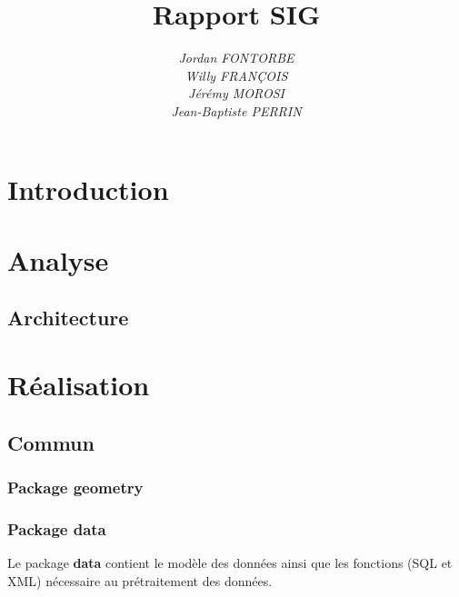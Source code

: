 \documentclass[12pt,a4paper,oneside]{article}
\begin{document}
\title{\textbf{\Huge{Rapport SIG}}}
\author{
	\textit{Jordan FONTORBE}\\
	\textit{Willy FRANÇOIS}\\
	\textit{Jérémy MOROSI}\\
	\textit{Jean-Baptiste PERRIN}
}

\maketitle
\newpage

\tableofcontents
\newpage

\section{Introduction}


\section{Analyse}

\subsection{Architecture}


\section{Réalisation}

\subsection{Commun}
\subsubsection{Package geometry}
\subsubsection{Package data}
Le package \textbf{data} contient le modèle des données ainsi que les fonctions (SQL et XML) nécessaire au prétraitement des données.
\end{document}

